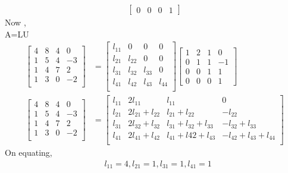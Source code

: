 \documentclass{report}
\begin{document}
{\begin{align*}
\begin{bmatrix}
            0&0&0&1
        \end{bmatrix}
    \end{align*}
    Now ,\\
    A=LU\\
    \begin{align*}
        \begin{bmatrix}
            4& 8& 4& 0 \\
            1& 5& 4& -3\\
            1& 4& 7& 2\\
            1& 3& 0& -2\\
        \end{bmatrix} & = 
        \begin{bmatrix}
            l_{11} &0&0&0\\
            l_{21}&l_{22}&0&0\\
            l_{31}&l_{32}&l_{33}&0\\
            l_{41}&l_{42}&l_{43}&l_{44}\\
        \end{bmatrix}
        \begin{bmatrix}            
            1& 2& 1& 0\\
            0& 1& 1& -1\\
            0&0&1&1\\
            0&0&0&1
        \end{bmatrix} \\       
        \begin{bmatrix}
            4& 8& 4& 0 \\
            1& 5& 4& -3\\
            1& 4& 7& 2\\
            1& 3& 0& -2\\
        \end{bmatrix} & = 
        \begin{bmatrix}
            l_{11} &2l_{11}&l_{11}&0\\
            l_{21}&2l_{21}+l_{22}&l_{21}+l_{22}&-l_{22}\\
            l_{31}&2l_{32}+l_{32}&l_{31}+l_{32}+l_{33}&-l_{32}+l_{33}\\
            l_{41}&2l_{41}+l_{42}&l_{41}+l{42}+l_{43}&-l_{42}+l_{43}+l_{44}\\
        \end{bmatrix}
    \end{align*}
On equating,
\begin{align*}    
    &l_{11}=4 ,l_{21}=1,l_{31}=1,l_{41}=1\\

\end{align*}}
\end{document}
